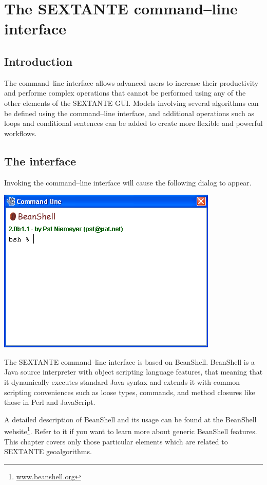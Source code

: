\chapter{The SEXTANTE command--line interface}
\section{Introduction}

The command--line interface allows advanced users to increase their productivity and performe complex operations that cannot be performed using any of the other elements of the SEXTANTE GUI. Models involving several algorithms can be defined using the command--line interface, and additional operations such as loops and conditional sentences can be added to create more flexible and powerful workflows.


\section{The interface}

Invoking the command--line interface will cause the following dialog to appear.

\begin{center}
\includegraphics[width=.6\columnwidth]{command_line.png}
\end{center}

The SEXTANTE command--line interface is based on BeanShell. BeanShell is a Java source interpreter with object scripting language features, that meaning that it dynamically executes standard Java syntax and extends it with common scripting conveniences such as loose types, commands, and method closures like those in Perl and JavaScript. 

A detailed description of BeanShell and its usage can be found at the BeanShell website\footnote{\url{www.beanshell.org}}. Refer to it if you want to learn more about generic BeanShell features. This chapter covers only those particular elements which are related to SEXTANTE geoalgorithms.


